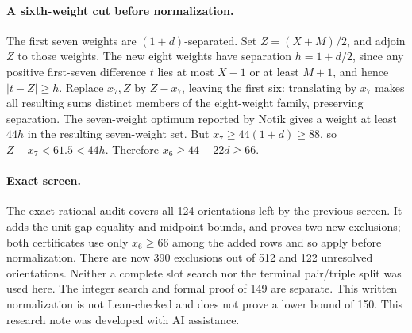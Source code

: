 \documentclass[10pt,letterpaper]{article}
\begin{document}
\paragraph{A sixth-weight cut before normalization.}
The first seven weights are \((1+d)\)-separated.
Set \(Z=(X+M)/2\), and adjoin \(Z\) to those weights.
The new eight weights have separation \(h=1+d/2\),
since any positive first-seven difference \(t\) lies at most
\(X-1\) or at least \(M+1\), and hence \(|t-Z|\ge h\).
Replace \(x_7,Z\) by \(Z-x_7\), leaving the first six:
translating by \(x_7\) makes all resulting sums distinct
members of the eight-weight family, preserving separation.
The
\href{https://arxiv.org/abs/2611.17360}{seven-weight optimum reported by Notik}
gives a weight at least \(44h\) in the resulting seven-weight set.
But \(x_7\ge44(1+d)\ge88\), so \(Z-x_7<61.5<44h\).
Therefore \(x_6\ge44+22d\ge66\).

\paragraph{Exact screen.}
The exact rational audit covers all 124 orientations left by the
\href{https://github.com/Aafimalek/novel-discoveries/tree/4091ab711e3e0e42f8a78d9c52eb19e561e69c0a/nine-separated-subset-sums/verification/rank-cuts-below-150/floor148-exact-root-screen}{previous screen}.
It adds the unit-gap equality and midpoint bounds, and proves
two new exclusions; both certificates use only \(x_6\ge66\)
among the added rows and so apply before normalization.
There are now 390 exclusions out of 512 and 122 unresolved
orientations. Neither a complete slot search nor the terminal
pair/triple split was used here. The integer search and formal
proof of 149 are separate. This written normalization is
not Lean-checked and does not prove a lower bound of 150.
\medskip\noindent
This research note was developed with AI assistance.
\end{document}
